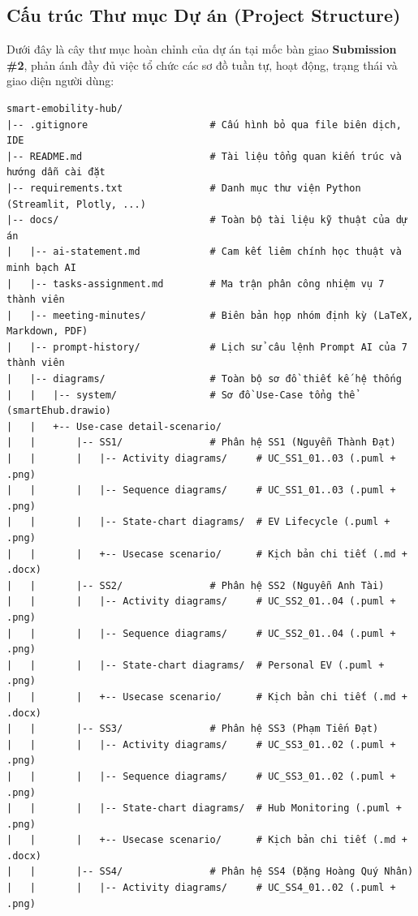 \documentclass[12pt,a4paper]{article}
\begin{document}
\subsection{Cấu trúc Thư mục Dự án (Project Structure)}
Dưới đây là cây thư mục hoàn chỉnh của dự án tại mốc bàn giao \textbf{Submission \#2}, phản ánh đầy đủ việc tổ chức các sơ đồ tuần tự, hoạt động, trạng thái và giao diện người dùng:

{\footnotesize
\begin{verbatim}
smart-emobility-hub/
|-- .gitignore                     # Cấu hình bỏ qua file biên dịch, IDE
|-- README.md                      # Tài liệu tổng quan kiến trúc và hướng dẫn cài đặt
|-- requirements.txt               # Danh mục thư viện Python (Streamlit, Plotly, ...)
|-- docs/                          # Toàn bộ tài liệu kỹ thuật của dự án
|   |-- ai-statement.md            # Cam kết liêm chính học thuật và minh bạch AI
|   |-- tasks-assignment.md        # Ma trận phân công nhiệm vụ 7 thành viên
|   |-- meeting-minutes/           # Biên bản họp nhóm định kỳ (LaTeX, Markdown, PDF)
|   |-- prompt-history/            # Lịch sử câu lệnh Prompt AI của 7 thành viên
|   |-- diagrams/                  # Toàn bộ sơ đồ thiết kế hệ thống
|   |   |-- system/                # Sơ đồ Use-Case tổng thể (smartEhub.drawio)
|   |   +-- Use-case detail-scenario/
|   |       |-- SS1/               # Phân hệ SS1 (Nguyễn Thành Đạt)
|   |       |   |-- Activity diagrams/     # UC_SS1_01..03 (.puml + .png)
|   |       |   |-- Sequence diagrams/     # UC_SS1_01..03 (.puml + .png)
|   |       |   |-- State-chart diagrams/  # EV Lifecycle (.puml + .png)
|   |       |   +-- Usecase scenario/      # Kịch bản chi tiết (.md + .docx)
|   |       |-- SS2/               # Phân hệ SS2 (Nguyễn Anh Tài)
|   |       |   |-- Activity diagrams/     # UC_SS2_01..04 (.puml + .png)
|   |       |   |-- Sequence diagrams/     # UC_SS2_01..04 (.puml + .png)
|   |       |   |-- State-chart diagrams/  # Personal EV (.puml + .png)
|   |       |   +-- Usecase scenario/      # Kịch bản chi tiết (.md + .docx)
|   |       |-- SS3/               # Phân hệ SS3 (Phạm Tiến Đạt)
|   |       |   |-- Activity diagrams/     # UC_SS3_01..02 (.puml + .png)
|   |       |   |-- Sequence diagrams/     # UC_SS3_01..02 (.puml + .png)
|   |       |   |-- State-chart diagrams/  # Hub Monitoring (.puml + .png)
|   |       |   +-- Usecase scenario/      # Kịch bản chi tiết (.md + .docx)
|   |       |-- SS4/               # Phân hệ SS4 (Đặng Hoàng Quý Nhân)
|   |       |   |-- Activity diagrams/     # UC_SS4_01..02 (.puml + .png)

\end{verbatim}}
\end{document}
